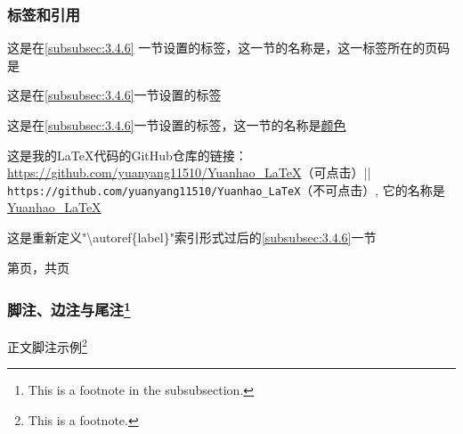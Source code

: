\documentclass{ctexart}
\begin{document}
        \subsubsection{标签和引用}
            这是在\ref{subsubsec:3.4.6} 一节设置的标签，这一节的名称是，这一标签所在的页码是\pageref{subsubsec:3.4.6}
            
            这是在\eqref{subsubsec:3.4.6}一节设置的标签

            这是在\autoref{subsubsec:3.4.6}一节设置的标签，这一节的名称是\hyperref[subsubsec:3.4.6]{颜色}

            这是我的\LaTeX 代码的GitHub仓库的链接：\url{https://github.com/yuanyang11510/Yuanhao_LaTeX}（可点击）|| %
            \nolinkurl{https://github.com/yuanyang11510/Yuanhao_LaTeX}（不可点击）, %
            它的名称是\href{https://github.com/yuanyang11510/Yuanhao_LaTeX}{Yuanhao\_LaTeX} 

            \renewcommand*{\subsubsectionautorefname}{小节标题}
            这是重新定义"\textbackslash autoref\{label\}"索引形式过后的\autoref{subsubsec:3.4.6}一节
        
            第\thepage 页，共\pageref{LastPage}页
            
        \subsubsection{脚注、边注与尾注\protect\footnote{This is a footnote in the subsubsection.}} %
            正文脚注示例\footnote{This is a footnote.}
\end{document}
